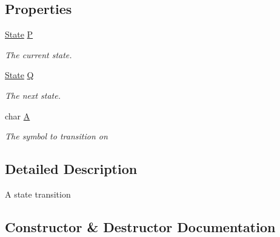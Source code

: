 \subsection*{Properties}
\begin{DoxyCompactItemize}
\item 
\mbox{\hyperlink{class_system_1_1_automata_1_1_state}{State}} \mbox{\hyperlink{class_system_1_1_automata_1_1_transition_adbb06230aadfde954396097f721ba575}{P}}
\begin{DoxyCompactList}\small\item\em The current state. \end{DoxyCompactList}\item 
\mbox{\hyperlink{class_system_1_1_automata_1_1_state}{State}} \mbox{\hyperlink{class_system_1_1_automata_1_1_transition_a41e49dbbe374855b54fe12112c317dc4}{Q}}
\begin{DoxyCompactList}\small\item\em The next state. \end{DoxyCompactList}\item 
char \mbox{\hyperlink{class_system_1_1_automata_1_1_transition_a692777c086d9aab84c1c3cce3a769473}{A}}
\begin{DoxyCompactList}\small\item\em The symbol to transition on \end{DoxyCompactList}\end{DoxyCompactItemize}


\subsection{Detailed Description}
A state transition 



\subsection{Constructor \& Destructor Documentation}
\mbox{\label{class_system_1_1_automata_1_1_transition_a15b9c85b9017f971a4d919975ed0d8d5}} 
